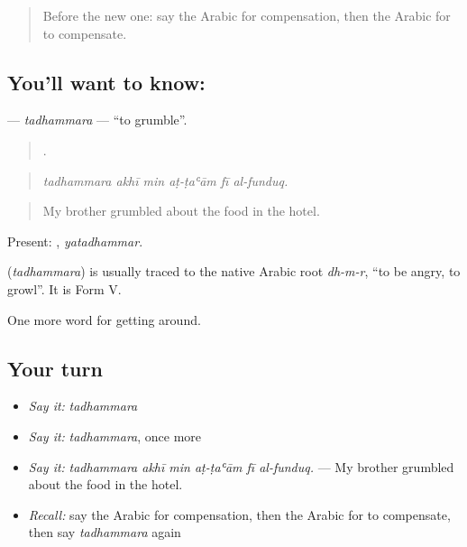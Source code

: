 \label{lesson:AR-C449-tadhammara}



\begin{quote}
Before the new one: say the Arabic for compensation, then the Arabic for to compensate.
\end{quote}

\subsection*{You'll want to know: }
\textbf{} — \emph{tadhammara} — \textquotedblleft{}to grumble\textquotedblright{}.

\begin{quote}
     .
\end{quote}

\begin{quote}
\emph{tadhammara akhī min aṭ-ṭaʿām fī al-funduq.}
\end{quote}

\begin{quote}
My brother grumbled about the food in the hotel.
\end{quote}

Present: , \emph{yatadhammar}.

\begin{cousinweb}
\textbf{} (\emph{tadhammara}) is usually traced to the native Arabic root \emph{dh-m-r}, \textquotedblleft{}to be angry, to growl\textquotedblright{}. It is Form V.
\end{cousinweb}

\begin{grammarlens}[title={What you've built}]
One more word for getting around.
\end{grammarlens}

\subsection*{Your turn}
\begin{itemize}
\raggedright
  \item \emph{Say it:} \emph{tadhammara}
  \item \emph{Say it:} \emph{tadhammara}, once more
  \item \emph{Say it:} \emph{tadhammara akhī min aṭ-ṭaʿām fī al-funduq.} — My brother grumbled about the food in the hotel.
  \item \emph{Recall:} say the Arabic for compensation, then the Arabic for to compensate, then say \emph{tadhammara} again
\end{itemize}

